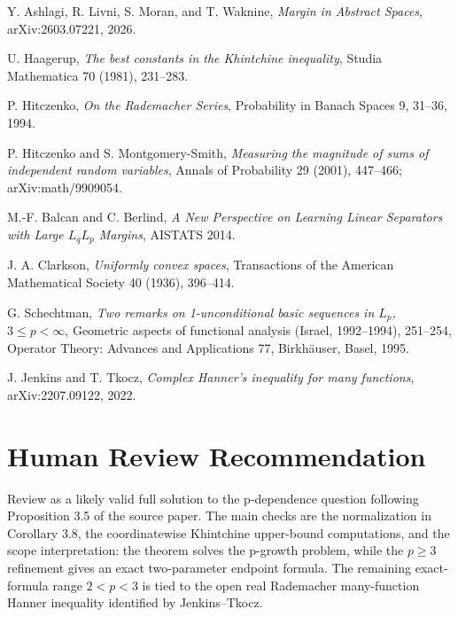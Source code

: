 \documentclass[11pt]{article}
\begin{document}
\begin{enumerate}[label={[\arabic*]}]
\item Y. Ashlagi, R. Livni, S. Moran, and T. Waknine,
\emph{Margin in Abstract Spaces}, arXiv:2603.07221, 2026.
\item U. Haagerup, \emph{The best constants in the Khintchine inequality},
Studia Mathematica 70 (1981), 231--283.
\item P. Hitczenko, \emph{On the Rademacher Series}, Probability in Banach
Spaces 9, 31--36, 1994.
\item P. Hitczenko and S. Montgomery-Smith,
\emph{Measuring the magnitude of sums of independent random variables},
Annals of Probability 29 (2001), 447--466; arXiv:math/9909054.
\item M.-F. Balcan and C. Berlind,
\emph{A New Perspective on Learning Linear Separators with Large \(L_qL_p\)
Margins}, AISTATS 2014.
\item J. A. Clarkson, \emph{Uniformly convex spaces}, Transactions of the
American Mathematical Society 40 (1936), 396--414.
\item G. Schechtman, \emph{Two remarks on 1-unconditional basic sequences in
\(L_p\), \(3\le p<\infty\)}, Geometric aspects of functional analysis
(Israel, 1992--1994), 251--254, Operator Theory: Advances and Applications 77,
Birkh\"auser, Basel, 1995.
\item J. Jenkins and T. Tkocz, \emph{Complex Hanner's inequality for many
functions}, arXiv:2207.09122, 2022.
\end{enumerate}

\section*{Human Review Recommendation}

Review as a likely valid full solution to the p-dependence question following
Proposition 3.5 of the source paper.  The main checks are the normalization in
Corollary 3.8, the coordinatewise Khintchine upper-bound computations, and the
scope interpretation: the theorem solves the p-growth problem, while the
\(p\ge3\) refinement gives an exact two-parameter endpoint formula.  The
remaining exact-formula range \(2<p<3\) is tied to the open real Rademacher
many-function Hanner inequality identified by Jenkins--Tkocz.
\end{document}
